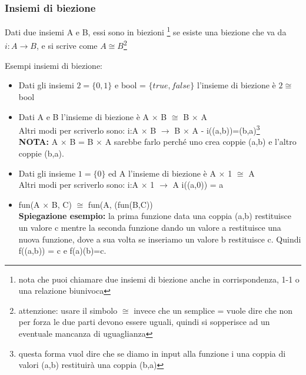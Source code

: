 \subsubsection{Insiemi di biezione}
\begin{definition}
Dati due insiemi A e B, essi sono in biezioni \footnote{nota che puoi chiamare due insiemi di biezione anche in corrispondenza, 1-1 o una relazione biunivoca} se esiste una biezione che va da $i: A \longrightarrow B$, e si scrive come $A \cong B$\footnote{attenzione: usare il simbolo $\cong$ invece che un semplice = vuole dire che non per forza le due parti devono essere uguali, quindi si sopperisce ad un eventuale mancanza di uguaglianza}
\end{definition}
\begin{example}
    Esempi insiemi di biezione:
    \begin{itemize}
        \item Dati gli insiemi $2 = \{0,1\}$ e bool = $\{true, false\}$ \hspace{.3cm} l'insieme di biezione è $2 \cong$ bool
        \item Dati A e B \hspace{.3cm} l'insieme di biezione è A $\times$ B $\cong$ B $\times$ A \\
        Altri modi per scriverlo sono: \hspace{.3cm} i:A $\times$ B $\longrightarrow$ B $\times$ A \: - \: i((a,b))=(b,a)\footnote{questa forma vuol dire che se diamo in input alla funzione i una coppia di valori (a,b) restituirà una coppia (b,a)}\\
        \textbf{NOTA:} A $\times$ B = B $\times$ A sarebbe farlo perché uno crea coppie (a,b) e l'altro coppie (b,a).
        \item Dati gli insieme $1 = \{0\}$ ed A \hspace{.3cm} l'insieme di biezione è A $\times$ 1 $\cong$ A \\
        Altri modi per scriverlo sono: \hspace{.3cm} i:A $\times$ 1 $\longrightarrow$ A \hspace{.3cm} i((a,0)) = a
        \item fun(A $\times$ B, C) $\cong$ fun(A, (fun(B,C))\\
        \textbf{Spiegazione esempio:} la prima funzione data una coppia (a,b) restituisce un valore c mentre la seconda funzione dando un valore a restituisce una nuova funzione, dove a sua volta se inseriamo un valore b restituisce c. Quindi f((a,b)) = c e f(a)(b)=c.
    \end{itemize}
\end{example}
